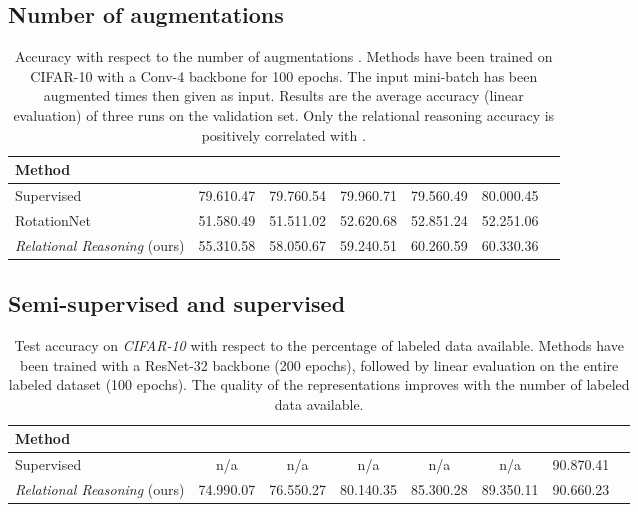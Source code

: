 \documentclass{article}
\begin{document}
\subsection{Number of augmentations}\label{appendix:number_augmentations}

\begin{table}[H]
 \caption{Accuracy with respect to the number of augmentations  . Methods have been trained on CIFAR-10 with a Conv-4 backbone for 100 epochs. The input mini-batch has been augmented  times then given as input. Results are the average accuracy (linear evaluation) of three runs on the validation set. Only the relational reasoning accuracy is positively correlated with .}
 \label{tab:number_augmentations}
 \begin{adjustbox}{width=0.9\columnwidth,center}
  \centering
  \begin{tabular}{lcccccc}
    \toprule
    \textbf{Method} &
     &  &  &  & \\
    \midrule
    Supervised & 
    79.61\small{0.47} & 79.76\small{0.54} & 79.96\small{0.71} & 79.56\small{0.49} &
    80.00\small{0.45}\\
    RotationNet \citep{gidaris2018unsupervised} & 
    51.58\small{0.49} & 51.51\small{1.02} & 52.62\small{0.68} & 52.85\small{1.24} &
    52.25\small{1.06}\\
    \emph{Relational Reasoning} (ours) & 
    55.31\small{0.58} & 58.05\small{0.67} & 59.24\small{0.51} & 60.26\small{0.59} &
    60.33\small{0.36} \\
    \bottomrule
  \end{tabular}
 \end{adjustbox}
\end{table}


\subsection{Semi-supervised and supervised}\label{appendix:semisupervised}

\begin{table}[H]
 \caption{Test accuracy on \emph{CIFAR-10} with respect to the percentage of labeled data available. Methods have been trained with a ResNet-32 backbone (200 epochs), followed by linear evaluation on the entire labeled dataset (100 epochs). The quality of the representations improves with the number of labeled data available.}
 \label{tab:semisupervised-cifar10}
 \begin{adjustbox}{width=1.0\columnwidth,center}
  \centering
  \begin{tabular}{lccccccc}
    \toprule
    \textbf{Method} &
     &  &  &  & & \\
    \midrule
    Supervised & 
    n/a & n/a & n/a & n/a & n/a & 90.87\small{0.41}\\
    \emph{Relational Reasoning} (ours) & 
    74.99\small{0.07} & 76.55\small{0.27} & 80.14\small{0.35} & 85.30\small{0.28} &
    89.35\small{0.11} & 90.66\small{0.23} \\
    \bottomrule
  \end{tabular}
 \end{adjustbox}
\end{table}
\end{document}
